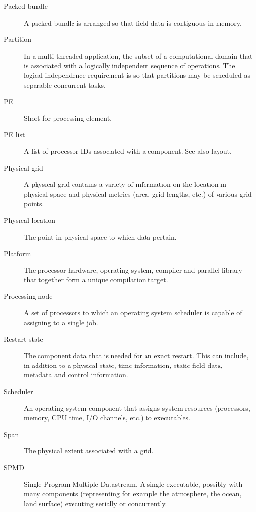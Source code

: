 \begin{description}
\item[Packed bundle] \label{glos:PackedBundle} A packed bundle is arranged
  so that field data is contiguous in memory.

\item[Partition] \label{glos:Partition} In a multi-threaded application, the subset of a
  computational domain that is associated with a logically independent
  sequence of operations. The logical independence requirement is so
  that partitions may be scheduled as separable concurrent tasks.

\item[PE] \label{glos:PE} Short for processing element.

\item[PE list] \label{glos:PElist} A list of processor IDs associated 
  with a component.  See also layout.

\item[Physical grid] \label{term:PhysGrid} 
  A physical grid contains a variety of information
  on the location in physical space and physical metrics (area,
  grid lengths, etc.) of various grid points.

\item[Physical location] \label{glos:PhysLoc} The point in physical space 
  to which data pertain. 

\item[Platform] \label{glos:Platform} 
  The processor hardware, operating system, compiler and
  parallel library that together form a unique compilation target.

\item[Processing node] \label{glos:Pnode} A set of processors to which an
  operating system scheduler is capable of assigning to a single job.

\item[Restart state] \label{glos:RestartState} The component 
  data that 
  is needed for an exact restart. This can include, in addition to 
  a physical state,  time information, static field data,
  metadata and control information. 

\item[Scheduler] \label{glos:Scheduler} An operating system component 
  that assigns system
  resources (processors, memory, CPU time, I/O channels, etc.) to
  executables.

\item[Span] \label{glos:Span} The physical extent associated with a grid.

\item[SPMD] \label{glos:SPMD} Single Program Multiple Datastream. 
  A single executable, possibly with many 
  components (representing for example the atmosphere, the ocean, 
  land surface) executing serially or concurrently.


\end{description}
